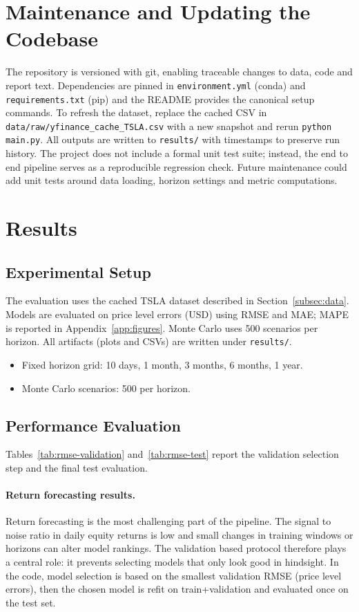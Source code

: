 \documentclass[11pt,a4paper]{article}
\begin{document}
\section{Maintenance and Updating the Codebase}
\label{sec:maintenance}
The repository is versioned with git, enabling traceable changes to data, code and report text. Dependencies are pinned in \texttt{environment.yml} (conda) and \texttt{requirements.txt} (pip) and the README provides the canonical setup commands. To refresh the dataset, replace the cached CSV in \texttt{data/raw/yfinance\_cache\_TSLA.csv} with a new snapshot and rerun \texttt{python main.py}. All outputs are written to \texttt{results/} with timestamps to preserve run history. The project does not include a formal unit test suite; instead, the end to end pipeline serves as a reproducible regression check. Future maintenance could add unit tests around data loading, horizon settings and metric computations.

\section{Results}
\label{sec:results}

\subsection{Experimental Setup}
The evaluation uses the cached TSLA dataset described in Section~\ref{subsec:data}. Models are evaluated on price level errors (USD) using RMSE and MAE; MAPE is reported in Appendix~\ref{app:figures}. Monte Carlo uses 500 scenarios per horizon. All artifacts (plots and CSVs) are written under \texttt{results/}.
\begin{itemize}
    \item Fixed horizon grid: 10 days, 1 month, 3 months, 6 months, 1 year.
    \item Monte Carlo scenarios: 500 per horizon.
\end{itemize}

\subsection{Performance Evaluation}
Tables~\ref{tab:rmse-validation} and~\ref{tab:rmse-test} report the validation selection step and the final test evaluation.

\paragraph{Return forecasting results.}
Return forecasting is the most challenging part of the pipeline. The signal to noise ratio in daily equity returns is low and small changes in training windows or horizons can alter model rankings. The validation based protocol therefore plays a central role: it prevents selecting models that only look good in hindsight. In the code, model selection is based on the smallest validation RMSE (price level errors), then the chosen model is refit on train+validation and evaluated once on the test set.
\end{document}
